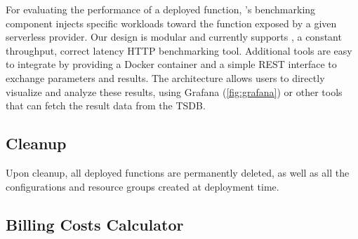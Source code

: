 For evaluating the performance of a deployed function, \sys's benchmarking component injects specific workloads toward the function exposed by a given serverless provider.
Our design is modular and currently supports , a constant throughput, correct latency HTTP benchmarking tool. 
Additional tools are easy to integrate by providing a Docker container and a simple REST interface to exchange parameters and results. 
The \sys architecture allows users to directly visualize and analyze these results, using Grafana (\autoref{fig:grafana}) or other tools that can fetch the result data from the \gls{TSDB}.

\subsection{Cleanup}

Upon cleanup, all deployed functions are permanently deleted, as well as all the configurations and resource groups created at deployment time.




\subsection{Billing Costs Calculator}
\label{ssec:billingcalc}

